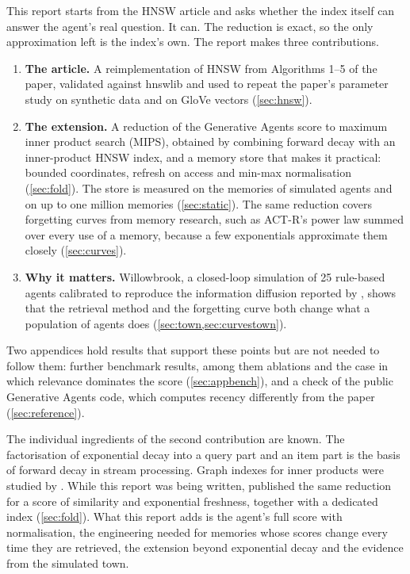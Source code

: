 \documentclass[11pt,a4paper]{article}
\begin{document}
This report starts from the HNSW article and asks whether the index itself can answer the agent's real question. It can. The reduction is exact, so the only approximation left is the index's own. The report makes three contributions.
\begin{enumerate}
\item \textbf{The article.} A reimplementation of HNSW from Algorithms 1--5 of the paper, validated against hnswlib and used to repeat the paper's parameter study on synthetic data and on GloVe vectors (\cref{sec:hnsw}).
\item \textbf{The extension.} A reduction of the Generative Agents score to maximum inner product search (MIPS), obtained by combining forward decay \citep{cormode2009forward} with an inner-product HNSW index, and a memory store that makes it practical: bounded coordinates, refresh on access and min-max normalisation (\cref{sec:fold}). The store is measured on the memories of simulated agents and on up to one million memories (\cref{sec:static}). The same reduction covers forgetting curves from memory research, such as ACT-R's power law summed over every use of a memory, because a few exponentials approximate them closely (\cref{sec:curves}).
\item \textbf{Why it matters.} Willowbrook, a closed-loop simulation of 25 rule-based agents calibrated to reproduce the information diffusion reported by \citet{park2023generative}, shows that the retrieval method and the forgetting curve both change what a population of agents does (\cref{sec:town,sec:curvestown}).
\end{enumerate}
Two appendices hold results that support these points but are not needed to follow them: further benchmark results, among them ablations and the case in which relevance dominates the score (\cref{sec:appbench}), and a check of the public Generative Agents code, which computes recency differently from the paper (\cref{sec:reference}).

The individual ingredients of the second contribution are known. The factorisation of exponential decay into a query part and an item part is the basis of forward decay in stream processing. Graph indexes for inner products were studied by \citet{morozov2018ipnsw}. While this report was being written, \citet{wei2026tango} published the same reduction for a score of similarity and exponential freshness, together with a dedicated index (\cref{sec:fold}). What this report adds is the agent's full score with normalisation, the engineering needed for memories whose scores change every time they are retrieved, the extension beyond exponential decay and the evidence from the simulated town.
\end{document}
